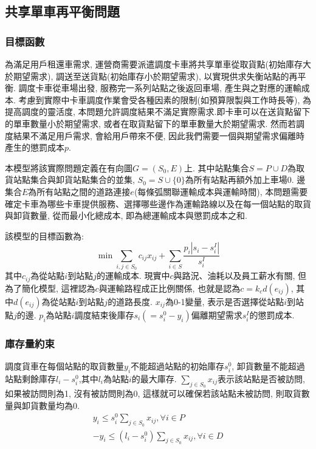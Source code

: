 \subsection{共享單車再平衡問題}
\subsubsection{目標函數}
為滿足用戶租還車需求, 運營商需要派遣調度卡車將共享單車從取貨點(初始庫存大於期望需求), 調送至送貨點(初始庫存小於期望需求), 以實現供求失衡站點的再平衡. 調度卡車從車場出發, 服務完一系列站點之後返回車場, 產生與之對應的運輸成本. 考慮到實際中卡車調度作業會受各種因素的限制(如預算限製與工作時長等), 為提高調度的靈活度, 本問題允許調度結果不滿足實際需求.即卡車可以在送貨點留下的單車數量小於期望需求, 或者在取貨點留下的單車數量大於期望需求. 然而若調度結果不滿足用戶需求, 會給用戶帶來不便, 因此我們需要一個與期望需求偏離時產生的懲罰成本\(p\).

本模型將該實際問題定義在有向圖\(G=(S_0, E)\)上. 其中站點集合\(S = P\cup D\)為取貨站點集合與卸貨站點集合的並集, \(S_0 = S\cup\{0\}\)為所有站點再額外加上車場\(0\). 邊集合\(E\)為所有站點之間的道路連接\(e\)(每條弧關聯運輸成本與運輸時間), 本問題需要確定卡車為哪些卡車提供服務、選擇哪些邊作為運輸路線以及在每一個站點的取貨與卸貨數量, 從而最小化總成本, 即為總運輸成本與懲罰成本之和.

該模型的目標函數為:
\begin{equation}
\min \sum_{i,j\in S_0}c_{ij}x_{ij} + \sum_{i\in S}\frac{p_i|s_i - s_i^I|}{s_i^I}
\end{equation}
其中\(c_{ij}\)為從站點\(i\)到站點\(j\)的運輸成本. 現實中\(c\)與路況、油耗以及員工薪水有關, 但為了簡化模型, 這裡認為\(c\)與運輸路程成正比例關係, 也就是認為\(c=k_c d(e_{ij})\), 其中\(d(e_{ij})\)為從站點\(i\)到站點\(j\)的道路長度.
\(x_{ij}\)為0-1變量, 表示是否選擇從站點\(i\)到站點\(j\)的邊.
\(p_i\)為站點\(i\)調度結束後庫存\(s_i(= s_i^0 - y_i)\)偏離期望需求\(s_i^I\)的懲罰成本. 
\subsubsection{庫存量約束}


調度貨車在每個站點的取貨數量\(y_i\)不能超過站點的初始庫存\(s_i^0\), 卸貨數量不能超過站點剩餘庫存\(l_i - s_i^0\),其中\(l_i\)為站點\(i\)的最大庫存. \(\sum_{j\in S_0}x_{ij}\)表示該站點是否被訪問, 如果被訪問則為1, 沒有被訪問則為0, 這樣就可以確保若該站點未被訪問, 則取貨數量與卸貨數量均為0.
\begin{gather}
y_i \leqslant s_i^0 \sum_{j\in S_0}x_{ij}, \forall i\in P\\
-y_i \leqslant \left(l_i - s_i^0\right)\sum_{j\in S_0}x_{ij}, \forall i\in D
\end{gather}
